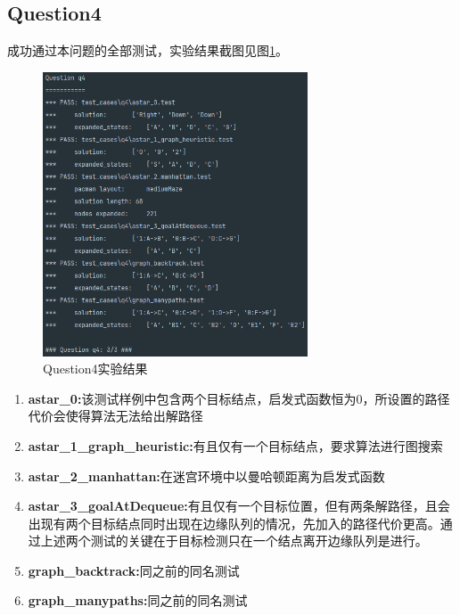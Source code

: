 \subsection{Question4}
成功通过本问题的全部测试，实验结果截图见图\ref{q4}。
\begin{figure}[!htbp]
    \centering
    \includegraphics[width=0.7\textwidth]{pic/q4.png}
    \caption{Question4实验结果}\label{q4}
\end{figure}
\begin{enumerate}
    \item {\bfseries astar\_0:}该测试样例中包含两个目标结点，启发式函数恒为0，所设置的路径代价会使得算法无法给出解路径
    \item {\bfseries astar\_1\_graph\_heuristic:}有且仅有一个目标结点，要求算法进行图搜索
    \item {\bfseries astar\_2\_manhattan:}在迷宫环境中以曼哈顿距离为启发式函数
    \item {\bfseries astar\_3\_goalAtDequeue:}有且仅有一个目标位置，但有两条解路径，且会出现有两个目标结点同时出现在边缘队列的情况，先加入的路径代价更高。通过上述两个测试的关键在于目标检测只在一个结点离开边缘队列是进行。
    \item {\bfseries graph\_backtrack:}同之前的同名测试
    \item {\bfseries graph\_manypaths:}同之前的同名测试
\end{enumerate}
%
%
